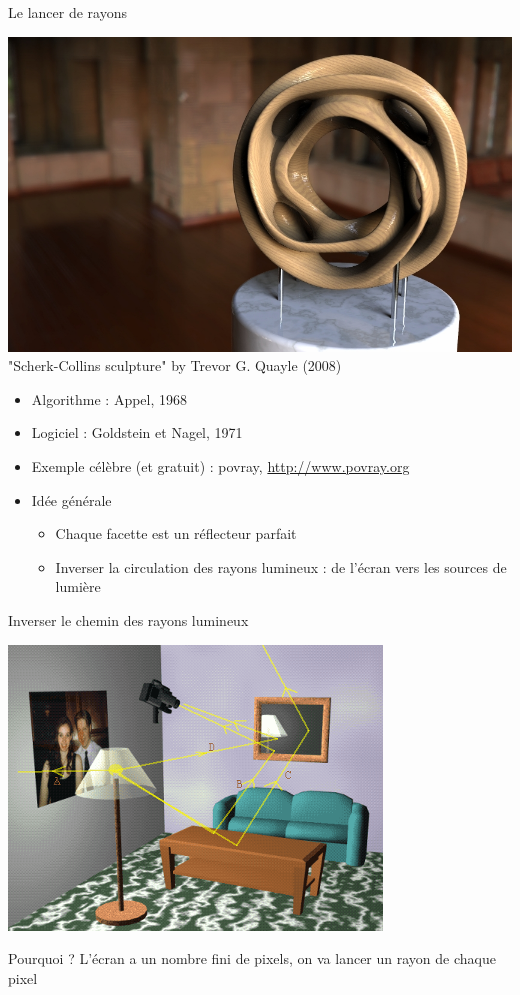 \begin{frame}{Le lancer de rayons}
    \begin{center}
        \includegraphics[width=.4\textwidth]{figs/sherk-collins.jpg}\\
        {\tiny "Scherk-Collins sculpture" by Trevor G. Quayle (2008)}
    \end{center}
    \begin{itemize}
        \item Algorithme : Appel, 1968 
        \item Logiciel : Goldstein et Nagel, 1971
        \item Exemple célèbre (et gratuit) : povray, \url{http://www.povray.org}
        \item Idée générale
        \begin{itemize}
            \item Chaque facette est un réflecteur parfait 
            \item Inverser la circulation des rayons lumineux : de l'écran vers les sources de lumière
        \end{itemize}
    \end{itemize}
\end{frame}

\begin{frame}{Inverser le chemin des rayons lumineux}
    \begin{center}
        \includegraphics[width=.6\textwidth]{figs/rt-inverse.png}
    \end{center}
    Pourquoi ? 
    L'écran a un nombre fini de pixels, on va lancer un rayon de chaque pixel
\end{frame}

